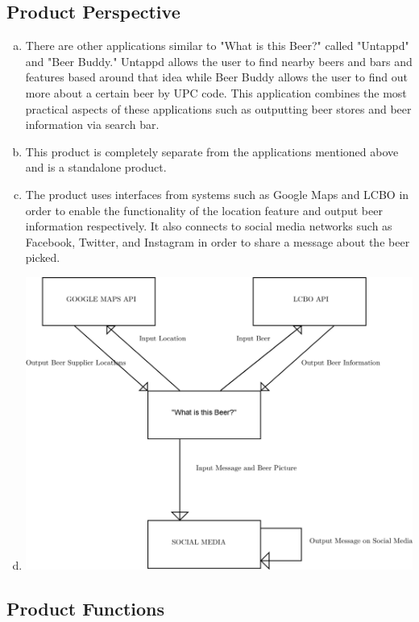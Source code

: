 \documentclass[]{article}
\begin{document}
\subsection{Product Perspective}
\label{sub:product_perspective}
\begin{enumerate}[a)]
	\item There are other applications similar to "What is this Beer?" called "Untappd" and "Beer Buddy." Untappd allows the user to find nearby beers and bars and features based around that idea while Beer Buddy allows the user to find out more about a certain beer by UPC code. This application combines the most practical aspects of these applications such as outputting beer stores and beer information via search bar. 
	\item This product is completely separate from the applications mentioned above and is a standalone product.
	\item The product uses interfaces from systems such as Google Maps and LCBO in order to enable the functionality of the location feature and output beer information respectively. It also connects to social media networks such as Facebook, Twitter, and Instagram in order to share a message about the beer picked.
	\item 

		\includegraphics[scale=0.1]{Block Diagram/Block Diagram.jpg}

	
\end{enumerate}

\subsection{Product Functions}
\label{sub:product_functions}
\end{document}
